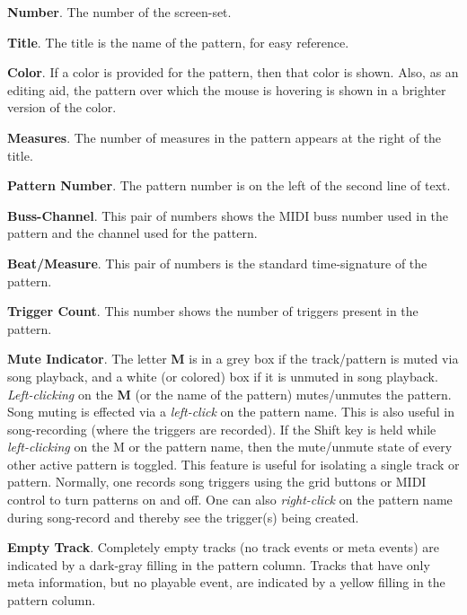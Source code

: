   \begin{enumber}
      \item \textbf{Number}.
         The number of the screen-set.
      \item \textbf{Title}.
         The title is the name of the pattern, for easy reference.
      \item \textbf{Color}.
         If a color is provided for the pattern, then that color is shown.
         Also, as an editing aid, the pattern over which the mouse is hovering
         is shown in a brighter version of the color.
      \item \textbf{Measures}.
         The number of measures in the pattern appears
         at the right of the title.
      \item \textbf{Pattern Number}.
         The pattern number is on the left of the second line of text.
      \item \textbf{Buss-Channel}.
         This pair of numbers shows the MIDI buss number used in the pattern
         and the channel used for the pattern.
      \item \textbf{Beat/Measure}.
         This pair of numbers is the standard time-signature of the pattern.
      \item \textbf{Trigger Count}.
         This number shows the number of triggers present in the pattern.
      \item \textbf{Mute Indicator}.
         The letter \textbf{M} is in a grey box if the track/pattern
         is muted via song playback,
         and a white (or colored) box if it is unmuted in song playback.
         \textsl{Left-clicking} on the \textbf{M} (or the name of the pattern)
         mutes/unmutes the pattern.
         Song muting is effected via a \textsl{left-click} on the pattern name.
         This is also useful in song-recording (where the triggers are recorded).
         If the Shift key is held while \textsl{left-clicking}
         on the M or the pattern name, then
         the mute/unmute state of every other active pattern is toggled.
         This feature is useful for isolating a single track or pattern.
         Normally, one records song triggers using the grid buttons or MIDI
         control to turn patterns on and off.
         One can also \textsl{right-click} on the pattern
         name during song-record and
         thereby see the trigger(s) being created.
      \item \textbf{Empty Track}.
         Completely empty tracks (no track events or meta events)
         are indicated by a dark-gray filling in the pattern column.
         Tracks that have only meta information, but no playable event, are
         indicated by a yellow filling in the pattern column.
   \end{enumber}

